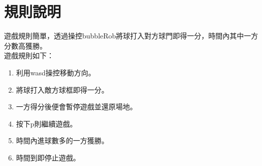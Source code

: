 \section{規則說明}
 遊戲規則簡單，透過操控bubbleRob將球打入對方球門即得一分，時間內其中一方分數高獲勝。\\
遊戲規則如下：
\begin{enumerate}
\item 利用wasd操控移動方向。
\item 將球打入敵方球框即得一分。
\item 一方得分後便會暫停遊戲並還原場地。
\item 按下p則繼續遊戲。
\item 時間內進球數多的一方獲勝。
\item 時間到即停止遊戲。
\end{enumerate}

\renewcommand{\baselinestretch}{0.5} %